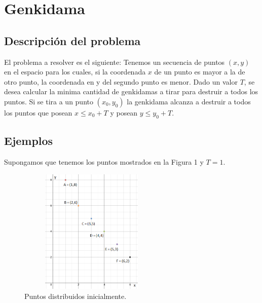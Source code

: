 \documentclass[10pt,a4paper]{article}
\begin{document}

\section{Genkidama}

\subsection{Descripción del problema}

El problema a resolver es el siguiente:
Tenemos un secuencia de puntos $(x,y)$ en el espacio para los cuales, si la coordenada $x$ de un punto es mayor a la de otro punto, la coordenada en y del segundo punto es menor. Dado un valor $T$, se desea calcular la minima cantidad de genkidamas a tirar para destruir a todos los puntos. Si se tira a un punto $(x_{0},y_{0})$ la genkidama alcanza a destruir a todos los puntos que posean $x \leq x_{0} + T$ y posean $y \leq y_{0} + T$.\\

\subsection{Ejemplos}

Supongamos que tenemos los puntos mostrados en la Figura 1 y $T = 1$.\\
\begin{figure}[h!]
  \centering
  \includegraphics[width=7cm, height=6cm]{EjemploInicialUtil}
  \caption{Puntos distribuidos inicialmente.}
\end{figure}
\end{document}
